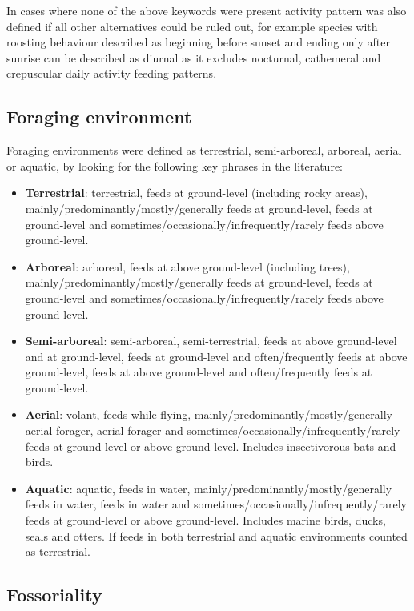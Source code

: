 In cases where none of the above keywords were present activity pattern was also defined if all other alternatives could be ruled out, for example species with roosting behaviour described as beginning before sunset and ending only after sunrise can be described as diurnal as it excludes nocturnal, cathemeral and crepuscular daily activity feeding patterns.
  


\subsection{Foraging environment}

Foraging environments were defined as terrestrial, semi-arboreal, arboreal, aerial or aquatic, by looking for the following key phrases in the literature:
\begin{itemize}
\item \textbf{Terrestrial}: terrestrial, feeds at ground-level (including rocky areas), mainly/predominantly/mostly/generally feeds at ground-level, feeds at ground-level and sometimes/occasionally/infrequently/rarely feeds above ground-level. 
\item \textbf{Arboreal}: arboreal, feeds at above ground-level (including trees), mainly/predominantly/mostly/generally feeds at ground-level, feeds at ground-level and sometimes/occasionally/infrequently/rarely feeds above ground-level.
\item \textbf{Semi-arboreal}: semi-arboreal, semi-terrestrial, feeds at above ground-level and at ground-level, feeds at ground-level and often/frequently feeds at above ground-level, feeds at above ground-level and often/frequently feeds at ground-level.
\item \textbf{Aerial}: volant, feeds while flying, mainly/predominantly/mostly/generally aerial forager, aerial forager and sometimes/occasionally/infrequently/rarely feeds at ground-level or above ground-level. Includes insectivorous bats and birds.
\item \textbf{Aquatic}: aquatic, feeds in water, mainly/predominantly/mostly/generally feeds in water, feeds in water and sometimes/occasionally/infrequently/rarely feeds at ground-level or above ground-level. Includes marine birds, ducks, seals and otters. If feeds in both terrestrial and aquatic environments counted as terrestrial.
\end{itemize}


\subsection{Fossoriality}

